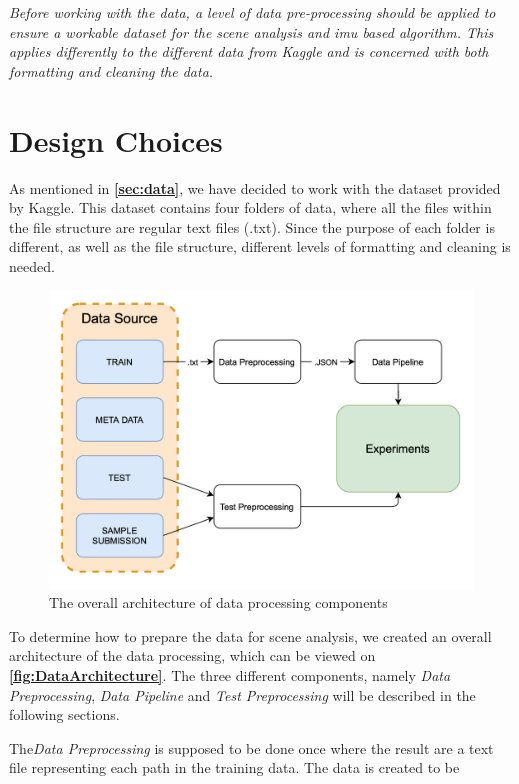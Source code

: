 \textit{Before working with the data, a level of data pre-processing should be applied to ensure a workable dataset for the scene analysis and \gls{imu} based algorithm. This applies differently to the different data from Kaggle and is concerned with both formatting and cleaning the data.}

\section{Design Choices}
As mentioned in \textbf{\autoref{sec:data}}, we have decided to work with the dataset provided by Kaggle. This dataset contains four folders of data, where all the files within the file structure are regular text files (.txt). Since the purpose of each folder is different, as well as the file structure, different levels of formatting and cleaning is needed.

\begin{figure}[H]
    \centering
    \includegraphics[scale=0.35]{Images/DataStandard/DataFlow.png}
    \caption{The overall architecture of data processing components}
    \label{fig:DataArchitecture}
\end{figure}

To determine how to prepare the data for scene analysis, we created an overall architecture of the data processing, which can be viewed on \textbf{\autoref{fig:DataArchitecture}}. The three different components, namely \textit{Data Preprocessing}, \textit{Data Pipeline} and \textit{Test Preprocessing} will be described in the following sections. 

The\textit{Data Preprocessing} is supposed to be done once where the result are a text file representing each path in the training data. The data is created to be 

